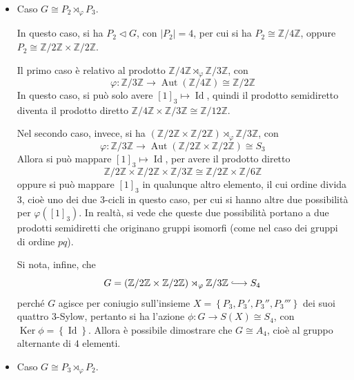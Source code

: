\documentclass[11pt]{article}
\theoremstyle{style}
\numberwithin{equation}{subsection}
\newcommand{\longhookrightarrow}{\lhook\joinrel\longrightarrow}
\begin{document}
\begin{itemize}
	\item Caso $G \cong P_2 \rtimes _\varphi  P_3$.

		In questo caso, si ha $P_2 \lhd G$, con $\lvert P_2 \rvert =4$, per cui si ha $P_2\cong \mathbb{Z}/4\mathbb{Z}$, oppure $P_2\cong \mathbb{Z}/2\mathbb{Z}\times \mathbb{Z}/2\mathbb{Z}$.

		Il primo caso \`e relativo al prodotto $\mathbb{Z}/4\mathbb{Z} \rtimes _\varphi \mathbb{Z}/3\mathbb{Z}$, con
		\[
			\varphi : \mathbb{Z}/3\mathbb{Z}\longrightarrow \operatorname{Aut} (\mathbb{Z}/4\mathbb{Z}) \cong \mathbb{Z}/2\mathbb{Z}
		\] 
		In questo caso, si pu\`o solo avere $[1]_3 \mapsto \operatorname{Id} $, quindi il prodotto semidiretto diventa il prodotto diretto $\mathbb{Z}/4\mathbb{Z} \times \mathbb{Z}/3\mathbb{Z} \cong \mathbb{Z}/12\mathbb{Z}$.

		Nel secondo caso, invece, si ha $(\mathbb{Z}/2\mathbb{Z} \times \mathbb{Z}/2\mathbb{Z})\rtimes _\varphi  \mathbb{Z}/3\mathbb{Z}$, con
		\[
		\varphi :\mathbb{Z}/3\mathbb{Z} \longrightarrow \operatorname{Aut} (\mathbb{Z}/2\mathbb{Z}\times \mathbb{Z}/2\mathbb{Z})\cong S_3
		\] 
		Allora si pu\`o mappare $[1]_3\mapsto \operatorname{Id} $, per avere il prodotto diretto 
		\[
		\mathbb{Z}/2\mathbb{Z} \times \mathbb{Z}/2\mathbb{Z} \times \mathbb{Z}/3\mathbb{Z} \cong \mathbb{Z}/2\mathbb{Z} \times \mathbb{Z}/6\mathbb{Z}
		\] 
		oppure si pu\`o mappare $[1]_3$ in qualunque altro elemento, il cui ordine divida $3$, cio\`e uno dei due $3$-cicli in questo caso, per cui si hanno altre due possibilit\`a per $\varphi ([1]_3)$.
		In realt\`a, si vede che queste due possibilit\`a portano a due prodotti semidiretti che originano gruppi isomorfi (come nel caso dei gruppi di ordine $pq$).

		Si nota, infine, che 
		\[
		G = (\mathbb{Z}/2\mathbb{Z} \times \mathbb{Z}/2\mathbb{Z})\rtimes _\varphi \mathbb{Z}/3\mathbb{Z} \longhookrightarrow S_4
		\] 
		perch\'e $G$ agisce per coniugio sull'insieme $X=\left\{ P_3,P_3',P_3'',P_3''' \right\} $ dei suoi quattro $3$-Sylow, pertanto si ha l'azione $\phi :G \longrightarrow S(X) \cong S_4$, con $\operatorname{Ker} \phi  = \left\{ \operatorname{Id}  \right\} $.
		Allora \`e possibile dimostrare che $G\cong A_4$, cio\`e al gruppo alternante di $4$ elementi.
	\item Caso $G \cong P_3 \rtimes _\varphi  P_2$.


\end{itemize}
\end{document}
